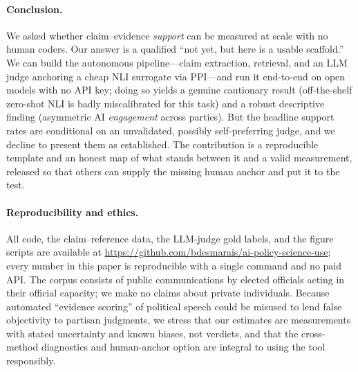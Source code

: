 \paragraph{Conclusion.} We asked whether claim--evidence \emph{support} can be measured at scale with no
human coders. Our answer is a qualified ``not yet, but here is a usable scaffold.'' We can build the
autonomous pipeline---claim extraction, retrieval, and an LLM judge anchoring a cheap NLI surrogate via
PPI---and run it end-to-end on open models with no API key; doing so yields a genuine cautionary result
(off-the-shelf zero-shot NLI is badly miscalibrated for this task) and a robust descriptive finding
(asymmetric AI \emph{engagement} across parties). But the headline support rates are conditional on an
unvalidated, possibly self-preferring judge, and we decline to present them as established. The
contribution is a reproducible template and an honest map of what stands between it and a valid
measurement, released so that others can supply the missing human anchor and put it to the test.

\paragraph{Reproducibility and ethics.} All code, the claim--reference data, the LLM-judge gold
labels, and the figure scripts are available at
\url{https://github.com/bdesmarais/ai-policy-science-use}; every number in this paper is reproducible
with a single command and no paid API. The corpus consists of public communications by elected
officials acting in their official capacity; we make no claims about private individuals. Because
automated ``evidence scoring'' of political speech could be misused to lend false objectivity to
partisan judgments, we stress that our estimates are measurements with stated uncertainty and known
biases, not verdicts, and that the cross-method diagnostics and human-anchor option are integral to
using the tool responsibly.
